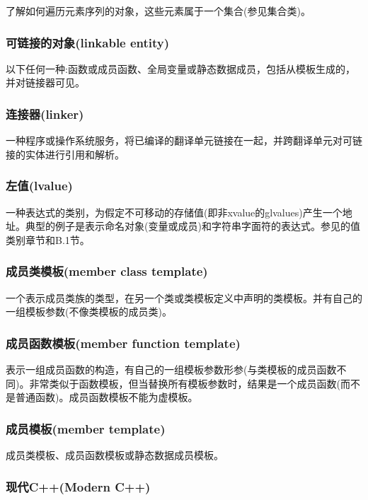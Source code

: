 了解如何遍历元素序列的对象，这些元素属于一个集合(参见集合类)。

\subsubsection{可链接的对象(linkable entity)}

以下任何一种:函数或成员函数、全局变量或静态数据成员，包括从模板生成的，并对链接器可见。

\subsubsection{连接器(linker)}

一种程序或操作系统服务，将已编译的翻译单元链接在一起，并跨翻译单元对可链接的实体进行引用和解析。

\subsubsection{左值(lvalue)}

一种表达式的类别，为假定不可移动的存储值(即非xvalue的glvalues)产生一个地址。典型的例子是表示命名对象(变量或成员)和字符串字面符的表达式。参见的值类别章节和B.1节。

\subsubsection{成员类模板(member class template)}

一个表示成员类族的类型，在另一个类或类模板定义中声明的类模板。并有自己的一组模板参数(不像类模板的成员类)。

\subsubsection{成员函数模板(member function template)}

表示一组成员函数的构造，有自己的一组模板参数形参(与类模板的成员函数不同)。非常类似于函数模板，但当替换所有模板参数时，结果是一个成员函数(而不是普通函数)。成员函数模板不能为虚模板。

\subsubsection{成员模板(member template)}

成员类模板、成员函数模板或静态数据成员模板。

\subsubsection{现代C++(Modern C++)}

